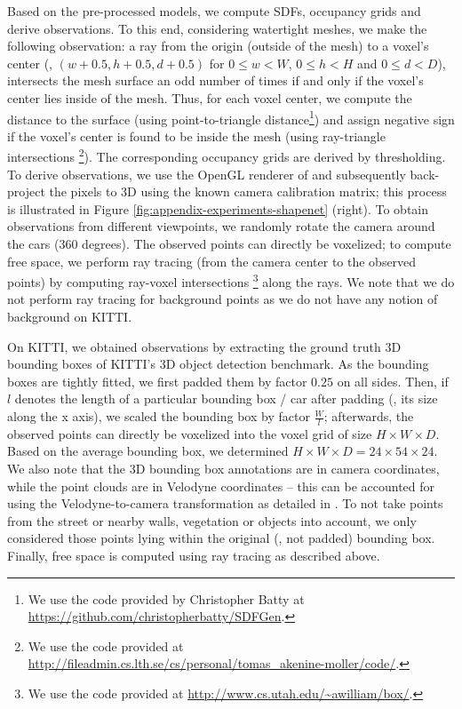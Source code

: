 \documentclass[10pt,letterpaper]{article}
\begin{document}
Based on the pre-processed models, we compute SDFs, occupancy grids and derive observations. To this end, considering watertight meshes, we make the following observation: a ray from the origin (outside of the mesh) to a voxel's center (\ie, $(w + 0.5, h + 0.5, d + 0.5)$ for $0\leq w<W$, $0\leq h<H$ and $0\leq d<D$), intersects the mesh surface an odd number of times if and only if the voxel's center lies inside of the mesh. Thus, for each voxel center, we compute the distance to the surface (using point-to-triangle distance\footnote{We use the code provided by Christopher Batty at \url{https://github.com/christopherbatty/SDFGen}.}) and assign negative sign if the voxel's center is found to be inside the mesh (using ray-triangle intersections \cite{Moller1997JGT}\footnote{We use the code provided at \url{http://fileadmin.cs.lth.se/cs/personal/tomas_akenine-moller/code/}.}). The corresponding occupancy grids are derived by thresholding. To derive observations, we use the OpenGL renderer of \cite{Guney2015CVPR} and subsequently back-project the pixels to 3D using the known camera calibration matrix; this process is illustrated in Figure \ref{fig:appendix-experiments-shapenet} (right). To obtain observations from different viewpoints, we randomly rotate the camera around the cars ($360$ degrees).  The observed points can directly be voxelized; to compute free space, we perform ray tracing (from the camera center to the observed points) by computing ray-voxel intersections \cite{Williams2005SIGGRAPH}\footnote{We use the code provided at \url{http://www.cs.utah.edu/~awilliam/box/}.} along the rays. We note that we do not perform ray tracing for background points as we do not have any notion of background on KITTI.



%
On KITTI, we obtained observations by extracting the ground truth 3D bounding boxes of KITTI's 3D object detection benchmark. As the bounding boxes are tightly fitted, we first padded them by factor $0.25$ on all sides. Then, if $l$ denotes the length of a particular bounding box / car after padding (\ie, its size along the x axis), we scaled the bounding box by factor $\frac{W}{l}$; afterwards, the observed points can directly be voxelized into the voxel grid of size $H \times W \times D$. Based on the average bounding box, we determined $H \times W \times D = 24 \times 54 \times 24$. We also note that the 3D bounding box annotations are in camera coordinates, while the point clouds are in Velodyne coordinates -- this can be accounted for using the Velodyne-to-camera transformation as detailed in \cite{Geiger2013IJRR}. To not take points from the street or nearby walls, vegetation or objects into account, we only considered those points lying within the original (\ie, not padded) bounding box. Finally, free space is computed using ray tracing as described above.
\end{document}
